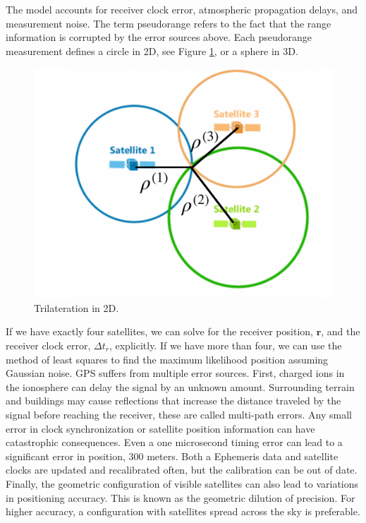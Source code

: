 The model accounts for receiver clock error, atmospheric propagation delays,
and measurement noise. The term pseudorange
refers to the fact that the range information is corrupted
by the error sources above. Each pseudorange measurement defines
a circle in 2D, see Figure \ref{gnss_1}, or a sphere in 3D. 


\begin{figure}[!htb]
\begin{center}
\includegraphics[scale=0.280]{img/hardware/gnss_1.jpeg}
\end{center}
\caption{Trilateration in 2D.}
\label{gnss_1}
\end{figure}


If we have exactly four satellites, we can solve for
the receiver position, $\mathbf{r}$, and the receiver clock error, $\Delta t_r$,  explicitly. If we have more than four, we can use the method of
least squares to find the maximum likelihood position
assuming Gaussian noise. GPS suffers from multiple error sources. First, charged ions in the ionosphere can delay
the signal by an unknown amount. Surrounding terrain and buildings
may cause reflections that increase the distance traveled by
the signal before reaching the receiver, these are called multi-path errors. Any small error in
clock synchronization or satellite position information can
have catastrophic consequences. Even a one microsecond
timing error can lead to a significant error in
position, 300 meters. Both a Ephemeris data
and satellite clocks are updated and recalibrated often, but the calibration can be out of date. Finally, the geometric configuration of visible satellites can also lead to
variations in positioning accuracy. This is known as the geometric
dilution of precision. For higher accuracy, a configuration with satellites spread across
the sky is preferable. 

